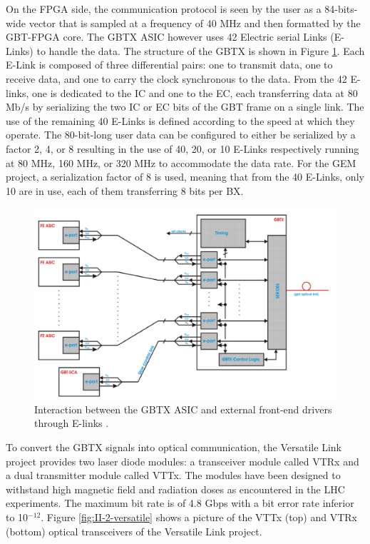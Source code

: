      On the FPGA side, the communication protocol is seen by the user as a 84-bits-wide vector that is sampled at a frequency of 40 MHz and then formatted by the GBT-FPGA core. The GBTX ASIC however uses 42 Electric serial Links (E-Links) to handle the data. The structure of the GBTX is shown in Figure \ref{fig:II-2-gbt-asic}. Each E-Link is composed of three differential pairs: one to transmit data, one to receive data, and one to carry the clock synchronous to the data. From the 42 E-links, one is dedicated to the IC and one to the EC, each transferring data at 80 Mb/s by serializing the two IC or EC bits of the GBT frame on a single link. The use of the remaining 40 E-Links is defined according to the speed at which they operate. The 80-bit-long user data can be configured to either be serialized by a factor 2, 4, or 8 resulting in the use of 40, 20, or 10 E-Links respectively running at 80 MHz, 160 MHz, or 320 MHz to accommodate the data rate. For the GEM project, a serialization factor of 8 is used, meaning that from the 40 E-Links, only 10 are in use, each of them transferring 8 bits per BX. \\

      \begin{figure}[t!]
        \centering
        \includegraphics[width=\textwidth]{img/II-2-daq/gbt-asic.png}
        \caption{Interaction between the GBTX ASIC and external front-end drivers through E-links \cite{Moreira:1235836}.}
        \label{fig:II-2-gbt-asic}
      \end{figure}

      To convert the GBTX signals into optical communication, the Versatile Link project provides two laser diode modules: a transceiver module called VTRx and a dual transmitter module called VTTx. The modules have been designed to withstand high magnetic field and radiation doses as encountered in the LHC experiments. The maximum bit rate is of 4.8 Gbps with a bit error rate inferior to 10$^{-12}$. Figure \ref{fig:II-2-versatile} shows a picture of the VTTx (top) and VTRx (bottom) optical transceivers of the Versatile Link project.

